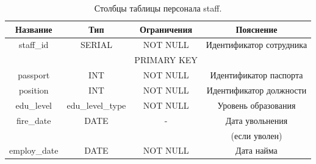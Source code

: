 \documentclass[a4paper,14pt]{article}
\begin{document}
\begin{table}[!h]
	\caption{Столбцы таблицы персонала staff.}
	\begin{center}
		\begin{tabular}{| c | c | c | c |}
	 	\hline
		Название & Тип & Ограничения & Пояснение \\ \hline
		staff\_id & SERIAL & NOT NULL & Идентификатор сотрудника \\
		 & & PRIMARY KEY &  \\ \hline
		passport & INT & NOT NULL & Идентификатор паспорта \\ \hline
		position & INT & NOT NULL & Идентификатор должности \\ \hline
		edu\_level & edu\_level\_type & NOT NULL & Уровень образования \\ \hline
		fire\_date & DATE & - & Дата увольнения \\
		 &  &  & (если уволен) \\ \hline
		employ\_date & DATE & NOT NULL & Дата найма \\ \hline
	\end{tabular}
	\end{center}
\end{table}
\end{document}
